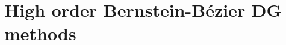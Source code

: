 \documentclass[compress]{beamer}
\begin{document}

\section{High order Bernstein-B\'{e}zier DG methods}
\end{document}
